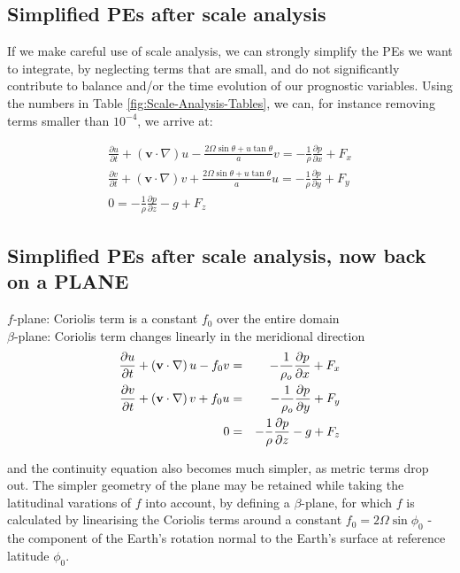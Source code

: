 \subsection{Simplified PEs after scale analysis}

If we make careful use of scale analysis, we can strongly simplify the PEs we want to integrate, by neglecting terms that are small, and do not significantly contribute to balance and/or the time evolution of our prognostic variables. Using the numbers in Table \ref{fig:Scale-Analysis-Tables}, we can, for instance removing terms smaller than $10^{-4}$, we arrive at:

\begin{eqnarray}
	\frac {\partial u}{\partial t} + \left(\mathbf{v}\cdot\nabla\right)u - \frac{2 \Omega \sin \theta + u \tan \theta}{a} v  = -\frac{1}{\rho} \frac{\partial p}{\partial x}+F_x \\
	\frac {\partial v}{\partial t} + \left(\mathbf{v}\cdot\nabla\right)v + \frac{2 \Omega \sin \theta +u \tan \theta}{a} u  = -\frac{1}{\rho} \frac{\partial p}{\partial y}+F_y \\
	0 =-\frac{1}{\rho} \frac{\partial p}{\partial z}-g+F_z
\end{eqnarray}

\subsection{Simplified PEs after scale analysis, now back on a PLANE}

$f$-plane: Coriolis term is a constant $f_0$ over the entire domain\\
$\beta$-plane: Coriolis term changes linearly in the meridional direction\\

\begin{eqnarray}
	\frac{\partial u}{\partial t} + \left( \mathbf{v} \cdot \nabla\right) u - f_0 v & = & -\frac{1}{\rho_o}\frac{\partial p}{\partial x} +F_x \\
	\frac{\partial v}{\partial t} + \left( \mathbf{v} \cdot \nabla\right) v + f_0 u & = & -\frac{1}{\rho_o}\frac{\partial p}{\partial y} +F_y \\
	0 & = & - \frac{1}{\rho} \frac{\partial p}{\partial z} - g + F_z
\end{eqnarray}

and the continuity equation also becomes much simpler, as metric terms drop out. The simpler geometry of the plane may be retained while taking the latitudinal varations of $f$ into account, by defining a $\beta$-plane, for which $f$ is calculated by linearising the Coriolis terms around a constant $f_0=2\Omega \sin\phi_0$ -
the component of the Earth's rotation normal to the Earth's surface at
reference latitude $\phi_0$. 	


